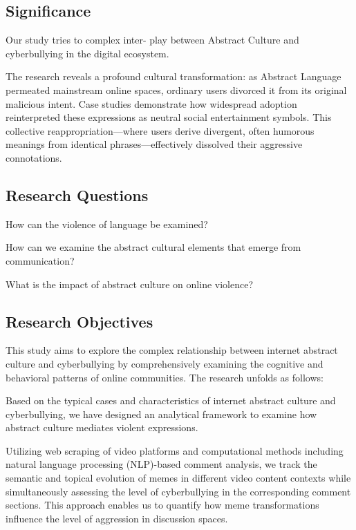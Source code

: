 \documentclass[12pt,a4paper]{ctexart}
\theoremstyle{MyLineTheoremStyle}
\theoremstyle{MyBlockTheoremStyle}
\theoremstyle{MySubsubsectionStyle}
\begin{document}
\subsection{Significance}
Our study  tries to  complex  inter- play between Abstract Culture and cyberbullying in the digital ecosystem.

The research reveals a profound cultural transformation: as Abstract Language permeated mainstream online spaces, ordinary users divorced it from its original malicious intent. Case studies demonstrate how widespread adoption reinterpreted these expressions as neutral social entertainment symbols. This collective reappropriation—where users derive divergent, often humorous meanings from identical phrases—effectively dissolved their aggressive connotations. 

\subsection{Research Questions}  
How can the violence of language be examined? %

How can we examine the abstract cultural elements that emerge from communication?%

What is the impact of abstract culture on online violence?%

\subsection{Research Objectives}%

This study aims to explore the complex relationship between internet abstract culture and cyberbullying by comprehensively examining the cognitive and behavioral patterns of online communities. The research unfolds as follows:

Based on the typical cases and characteristics of internet abstract culture and cyberbullying, we have designed an analytical framework to examine how abstract culture mediates violent expressions.

Utilizing web scraping of video platforms and computational methods including natural language processing (NLP)-based comment analysis, we track the semantic and topical evolution of memes in different video content contexts while simultaneously assessing the level of cyberbullying in the corresponding comment sections. This approach enables us to quantify how meme transformations influence the level of aggression in discussion spaces.
\end{document}
